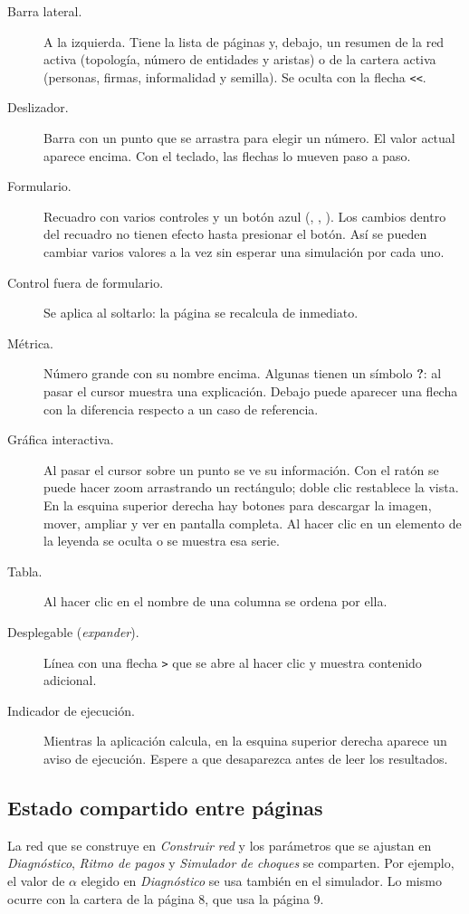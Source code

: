 \begin{description}
\item[Barra lateral.] A la izquierda. Tiene la lista de páginas y, debajo, un resumen de
la red activa (topología, número de entidades y aristas) o de la cartera activa
(personas, firmas, informalidad y semilla). Se oculta con la flecha \texttt{<<}.
\item[Deslizador.] Barra con un punto que se arrastra para elegir un número. El valor
actual aparece encima. Con el teclado, las flechas lo mueven paso a paso.
\item[Formulario.] Recuadro con varios controles y un botón azul (,
, ). Los cambios dentro del recuadro no tienen
efecto hasta presionar el botón. Así se pueden cambiar varios valores a la vez sin
esperar una simulación por cada uno.
\item[Control fuera de formulario.] Se aplica al soltarlo: la página se recalcula de
inmediato.
\item[Métrica.] Número grande con su nombre encima. Algunas tienen un símbolo
\textbf{?}: al pasar el cursor muestra una explicación. Debajo puede aparecer una
flecha con la diferencia respecto a un caso de referencia.
\item[Gráfica interactiva.] Al pasar el cursor sobre un punto se ve su información. Con
el ratón se puede hacer zoom arrastrando un rectángulo; doble clic restablece la vista.
En la esquina superior derecha hay botones para descargar la imagen, mover, ampliar y
ver en pantalla completa. Al hacer clic en un elemento de la leyenda se oculta o se
muestra esa serie.
\item[Tabla.] Al hacer clic en el nombre de una columna se ordena por ella.
\item[Desplegable (\emph{expander}).] Línea con una flecha \texttt{>} que se abre al
hacer clic y muestra contenido adicional.
\item[Indicador de ejecución.] Mientras la aplicación calcula, en la esquina superior
derecha aparece un aviso de ejecución. Espere a que desaparezca antes de leer los
resultados.
\end{description}

\subsection{Estado compartido entre páginas}
La red que se construye en \emph{Construir red} y los parámetros que se ajustan en
\emph{Diagnóstico}, \emph{Ritmo de pagos} y \emph{Simulador de choques} se comparten.
Por ejemplo, el valor de $\alpha$ elegido en \emph{Diagnóstico} se usa también en el
simulador. Lo mismo ocurre con la cartera de la página 8, que usa la página 9.

